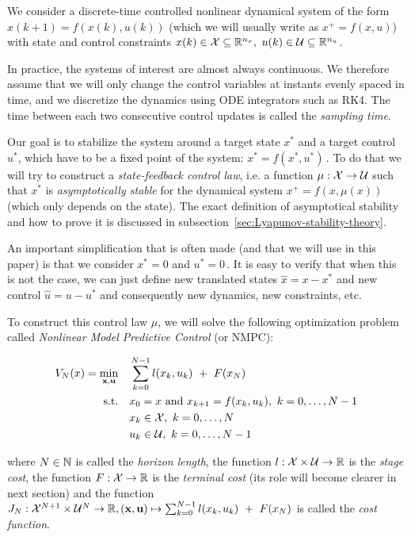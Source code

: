 \documentclass[12pt]{article}
\begin{document}
We consider a discrete-time controlled nonlinear dynamical system of the form $x(k+1)=f(x(k), u(k))$ (which we will usually write as $x^+=f(x,u)$) with state and control constraints $x(k)\in\cal{X}\subseteq\R^{n_x},~u(k)\in\cal{U}\subseteq\R^{n_u}$.

In practice, the systems of interest are almost always continuous. We therefore assume that we will only change the control variables at instants evenly spaced in time, and we discretize the dynamics using ODE integrators such as RK4. The time between each two consecutive control updates is called the \textit{sampling time}.

Our goal is to stabilize the system around a target state $x^*$ and a target control $u^*$, which have to be a fixed point of the system: $x^*=f(x^*, u^*)$\,.
To do that we will try to construct a \textit{state-feedback control law}, i.e. a function $\mu:\cal{X}\to\cal{U}$ such that $x^*$ is \textit{asymptotically stable} for the dynamical system $x^+=f(x,\mu(x))$ (which only depends on the state).
The exact definition of asymptotical stability and how to prove it is discussed in subsection~\ref{sec:Lyapunov-stability-theory}.

An important simplification that is often made (and that we will use in this paper) is that we consider $x^*=0$ and $u^*=0$\,.
It is easy to verify that when this is not the case, we can just define new translated states $\hat{x}=x-x^*$ and new control $\hat{u}=u-u^*$ and consequently new dynamics, new constraints, etc.

\noindent To construct this control law $\mu$, we will solve the following optimization problem called \textit{Nonlinear Model Predictive Control} (or NMPC):

\begin{align}
	\begin{split}
		\label{eq:NMPC}
		V_N(x)=\underset{\bf{x},\bf{u}}{\min} &\quad \sum_{k=0}^{N-1}l(x_k,u_k)~+~F(x_N)\\
		\text{s.t.} &\quad x_0=x\text{ and }x_{k+1}=f(x_k,u_k),~k=0,\ldots,N-1\\
		&\quad x_k\in\cal{X},~k=0,\ldots,N\\
		&\quad u_k\in\cal{U},~k=0,\ldots,N-1
	\end{split}
\end{align}

\noindent where $N\in\N$ is called the \textit{horizon length}, the function $l:\cal{X}\times\cal{U}\to\R$ is the \textit{stage cost}, the function $F:\cal{X}\to\R$ is the \textit{terminal cost} (its role will become clearer in next section) and the function $J_N:\cal{X}^{N+1}\times\cal{U}^N\to\R, (\bf{x},\bf{u})\mapsto\sum_{k=0}^{N-1}l(x_k,u_k)~+~F(x_N)$ is called the \textit{cost function}.
\end{document}
